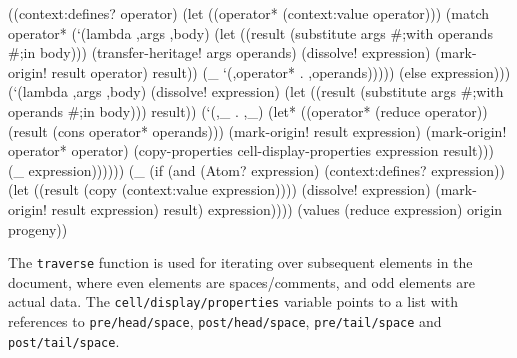 \documentclass[acmsmall]{acmart}
\newenvironment{Snippet}{\Verbatim[samepage=true]}{\endVerbatim}
\begin{document}
\begin{Snippet}
			  ((context:defines? operator)
			   (let ((operator* (context:value operator)))
			     (match operator*
\end{Snippet}
\begin{Snippet}
			       (`(lambda ,args ,body)
				(let ((result (substitute args #;with operands
                                                          #;in body)))
				  (transfer-heritage! args operands)
				  (dissolve! expression)
				  (mark-origin! result operator)
				  result))
\end{Snippet}
\begin{Snippet}
			       (_
				`(,operator* . ,operands)))))
\end{Snippet}
\begin{Snippet}
			  (else
			   expression)))
\end{Snippet}
\begin{Snippet}
		   (`(lambda ,args ,body)
		    (dissolve! expression)
		    (let ((result (substitute args #;with operands #;in body)))
		      result))
\end{Snippet}
\begin{Snippet}
		   (`(,_ . ,_)
		    (let* ((operator* (reduce operator))
			   (result (cons operator* operands)))
		      (mark-origin! result expression)
		      (mark-origin! operator* operator)
		      (copy-properties cell-display-properties expression result)))
\end{Snippet}
\begin{Snippet}
		   (_
		    expression))))))
\end{Snippet}
\begin{Snippet}
      (_
       (if (and (Atom? expression)
		(context:defines? expression))
	   (let ((result (copy (context:value expression))))
	     (dissolve! expression)
	     (mark-origin! result expression)
	     result)
\end{Snippet}
\begin{Snippet}
	   expression))))
\end{Snippet}
\begin{Snippet}
  (values (reduce expression)
	  origin
	  progeny))
\end{Snippet}

The \texttt{traverse} function is used for iterating over subsequent
elements in the document, where even elements are spaces/comments, and
odd elements are actual data.  The
\texttt{cell\-/display\-/pro\-per\-ties} variable points to a list with
references to \texttt{pre\-/head\-/space},
\texttt{post\-/head\-/space}, \texttt{pre\-/tail\-/space} and
\texttt{post\-/tail\-/space}.
\end{document}
